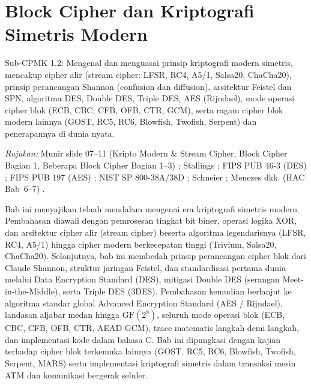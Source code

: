 \documentclass[main.tex]{subfiles}
\begin{document}
\chapter{Block Cipher dan Kriptografi Simetris Modern}

\begin{subcpmk}
  \item Sub-CPMK 1.2: Mengenal dan menguasai prinsip kriptografi modern simetris, mencakup cipher alir (stream cipher: LFSR, RC4, A5/1, Salsa20, ChaCha20), prinsip perancangan Shannon (confusion dan diffusion), arsitektur Feistel dan SPN, algoritma DES, Double DES, Triple DES, AES (Rijndael), mode operasi cipher blok (ECB, CBC, CFB, OFB, CTR, GCM), serta ragam cipher blok modern lainnya (GOST, RC5, RC6, Blowfish, Twofish, Serpent) dan penerapannya di dunia nyata.
\end{subcpmk}

\noindent\textit{Rujukan:} Munir slide 07--11 (Kripto Modern \& Stream Cipher, Block Cipher Bagian 1, Beberapa Block Cipher Bagian 1--3) \cite{munir_slides_itb}; Stallings \cite{stallings2017}; FIPS PUB 46-3 (DES) \cite{fips46_3}; FIPS PUB 197 (AES) \cite{fips197}; NIST SP 800-38A/38D \cite{nist800_38a, nist800_38d}; Schneier \cite{schneier1996}; Menezes dkk. (HAC Bab~6--7) \cite{menezes1996, hac_online}.

Bab ini menyajikan telaah mendalam mengenai era kriptografi simetris modern. Pembahasan diawali dengan pemrosesan tingkat bit biner, operasi logika XOR, dan arsitektur cipher alir (stream cipher) beserta algoritma legendarisnya (LFSR, RC4, A5/1) hingga cipher modern berkecepatan tinggi (Trivium, Salsa20, ChaCha20). Selanjutnya, bab ini membedah prinsip perancangan cipher blok dari Claude Shannon, struktur jaringan Feistel, dan standardisasi pertama dunia melalui Data Encryption Standard (DES), mitigasi Double DES (serangan Meet-in-the-Middle), serta Triple DES (3DES). Pembahasan kemudian berlanjut ke algoritma standar global Advanced Encryption Standard (AES / Rijndael), landasan aljabar medan hingga $\mathrm{GF}(2^8)$, seluruh mode operasi blok (ECB, CBC, CFB, OFB, CTR, AEAD GCM), trace matematis langkah demi langkah, dan implementasi kode dalam bahasa C. Bab ini dipungkasi dengan kajian terhadap cipher blok terkemuka lainnya (GOST, RC5, RC6, Blowfish, Twofish, Serpent, MARS) serta implementasi kriptografi simetris dalam transaksi mesin ATM dan komunikasi bergerak seluler.







\end{document}
